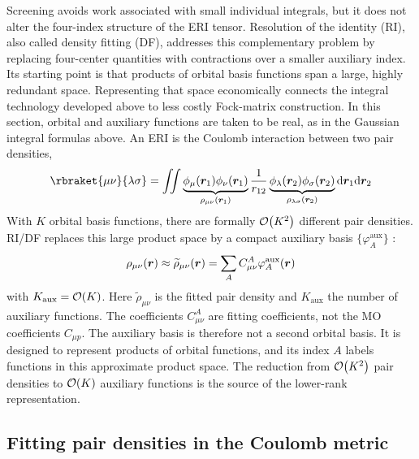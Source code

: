 Screening avoids work associated with small individual integrals, but it does
not alter the four-index structure of the ERI tensor. Resolution of the
identity (RI), also called density fitting (DF), addresses this complementary
problem by replacing four-center quantities with contractions over a smaller
auxiliary index. Its starting point is that products of orbital basis
functions span a large, highly redundant space. Representing that space
economically connects the integral technology developed above to less costly
Fock-matrix construction.
In this section, orbital and auxiliary functions are taken to be real, as in
the Gaussian integral formulas above. An ERI is the Coulomb interaction
between two pair densities,
\begin{equation}
 \rbraket{\mu\nu}{\lambda\sigma}
 =\iint
 \underbrace{\phi_\mu(\br_1)\phi_\nu(\br_1)}_{\rho_{\mu\nu}(\br_1)}
 \frac{1}{r_{12}}
 \underbrace{\phi_\lambda(\br_2)\phi_\sigma(\br_2)}
 _{\rho_{\lambda\sigma}(\br_2)}\dd\br_1\dd\br_2
\end{equation}
With $K$ orbital basis functions, there are formally $\order{K^2}$ different
pair densities. RI/DF replaces this
large product space by a compact auxiliary basis
$\{\varphi_A^\text{aux}\}$ \citep{Whitten1973,Dunlap1979,Vahtras1993}:
\begin{equation}
  \rho_{\mu\nu}(\boldsymbol{r})\approx
 \widetilde\rho_{\mu\nu}(\boldsymbol{r})
 =\sum_AC_{\mu\nu}^A\varphi_A^\text{aux}(\boldsymbol{r})
\end{equation}
with $K_\text{aux}=\order{K}$.
Here $\widetilde\rho_{\mu\nu}$ is the fitted pair density and
$K_\text{aux}$ the number of auxiliary functions. The coefficients
$C_{\mu\nu}^A$ are fitting coefficients, not the MO coefficients
$C_{\mu p}$. The auxiliary basis is therefore not a second orbital basis.
It is designed
to represent products of orbital functions, and its index $A$ labels
functions in this approximate product space. The reduction from
$\order{K^2}$ pair densities to $\order{K}$ auxiliary functions is the source
of the lower-rank representation.

\subsection{Fitting pair densities in the Coulomb metric}

